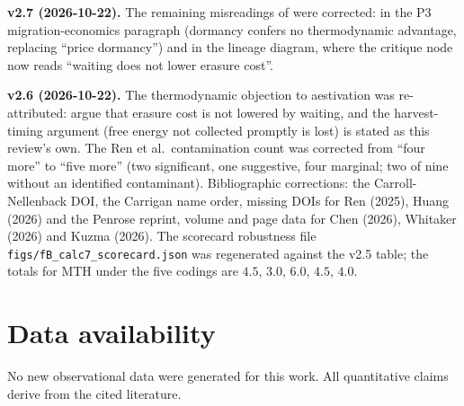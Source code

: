 \documentclass[11pt]{article}
\begin{document}
\textbf{v2.7 (2026-10-22).} The remaining misreadings of \citet{Bennett2019} were corrected: in the P3 migration-economics paragraph (dormancy confers no thermodynamic advantage, replacing ``price dormancy'') and in the lineage diagram, where the critique node now reads ``waiting does not lower erasure cost''.

\textbf{v2.6 (2026-10-22).} The thermodynamic objection to aestivation was re-attributed: \citet{Bennett2019} argue that erasure cost is not lowered by waiting, and the harvest-timing argument (free energy not collected promptly is lost) is stated as this review's own. The Ren et al.\ contamination count was corrected from ``four more'' to ``five more'' (two significant, one suggestive, four marginal; two of nine without an identified contaminant). Bibliographic corrections: the Carroll-Nellenback DOI, the Carrigan name order, missing DOIs for Ren (2025), Huang (2026) and the Penrose reprint, volume and page data for Chen (2026), Whitaker (2026) and Kuzma (2026). The scorecard robustness file \texttt{figs/fB\_calc7\_scorecard.json} was regenerated against the v2.5 table; the totals for MTH under the five codings are $4.5$, $3.0$, $6.0$, $4.5$, $4.0$.

\section*{Data availability}

No new observational data were generated for this work. All quantitative claims derive from the cited literature.



\end{document}
